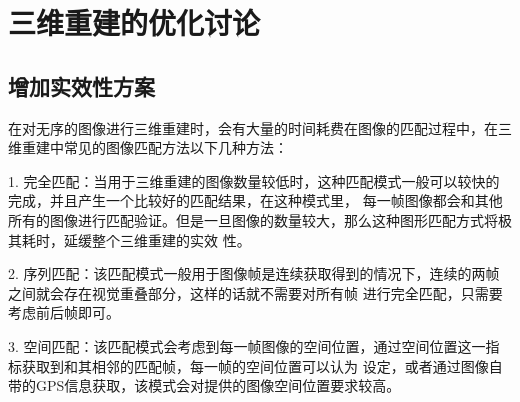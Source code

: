 \section{三维重建的优化讨论}
\label{sec:3.3}
\subsection{增加实效性方案}
\label{sec:3.3.2}
在对无序的图像进行三维重建时，会有大量的时间耗费在图像的匹配过程中，在三维重建中常见的图像匹配方法以下几种方法：

1.  完全匹配：当用于三维重建的图像数量较低时，这种匹配模式一般可以较快的完成，并且产生一个比较好的匹配结果，在这种模式里，
每一帧图像都会和其他所有的图像进行匹配验证。但是一旦图像的数量较大，那么这种图形匹配方式将极其耗时，延缓整个三维重建的实效
性。

2.  序列匹配：该匹配模式一般用于图像帧是连续获取得到的情况下，连续的两帧之间就会存在视觉重叠部分，这样的话就不需要对所有帧
进行完全匹配，只需要考虑前后帧即可。

3.  空间匹配：该匹配模式会考虑到每一帧图像的空间位置，通过空间位置这一指标获取到和其相邻的匹配帧，每一帧的空间位置可以认为
设定，或者通过图像自带的GPS信息获取，该模式会对提供的图像空间位置要求较高。

